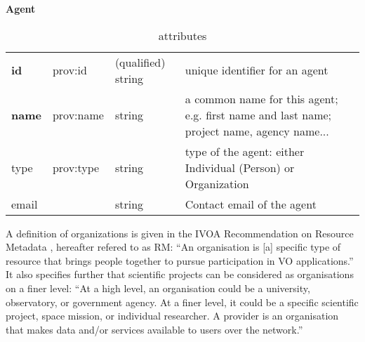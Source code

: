 \begin{table}[h]
\small
{}\textwidth
\textbf{\normalsize Agent}\vspace{0.25em}\\
\begin{tabulary}{1.0\textwidth}{@{}llp{2cm}L@{}}
\toprule
{} &  &  & \\
\midrule
\textbf{id} & prov:id & (qualified) string & unique identifier for an agent\\
\textbf{name} & prov:name & string & a common name for this agent; e.g. first name and last name; project name, agency name...\\
type & prov:type & string & type of the agent: either Individual (Person) or Organization\\
email   &  & string & Contact email of the agent\\
\bottomrule
\end{tabulary}
\caption[ attributes]{ attributes}
\label{tab:agent-attributes}
\end{table}



A definition of organizations is given in the 
IVOA Recommendation on Resource Metadata \citep{std:ResourceMeta}, hereafter 
refered to as RM: ``An organisation is [a] specific type of resource that 
brings people together to pursue participation in VO applications.''
It also specifies further that scientific projects can be considered 
as organisations on a finer level:
``At a high level, an organisation could be a university, observatory, or government
agency. At a finer level, it could be a specific scientific project, space mission,
or individual researcher. A provider is an organisation that makes data and/or services
available to users over the network.''



